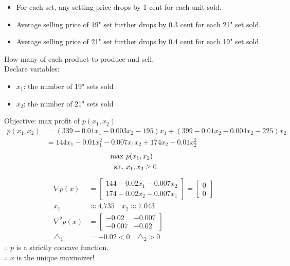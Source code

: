 \documentclass[11pt]{article}
\numberwithin{equation}{section}
\begin{document}
\begin{itemize}
    \item For each set, any setting price drops by 1 cent for each unit sold.
    \item Average selling price of 19" set further drops by 0.3 cent for each 21" set sold.
    \item Average selling price of 21" set further drops by 0.4 cent for each 19" set sold.
\end{itemize}
How many of each product to produce and sell. \\
Declare variables:\begin{itemize}
    \item $x_1$: the number of 19" sets sold
    \item $x_2$: the number of 21" sets sold
\end{itemize}
Objective: max profit of $p(x_1, x_2)$ \begin{align*}
    p(x_1, x_2) &= \left( 339 - 0.01x_1 - 0.003x_2-195 \right)x_1 + \left( 399 - 0.01x_2 - 0.004x_2 - 225 \right)x_2 \\
    &= 144 x_1 - 0.01 x_1^2 - 0.007 x_1 x_2 + 174 x_2 - 0.01 x_2^2
\end{align*}
\begin{align*}
    \max \ & p(x_1, x_2) \\
    \text{s.t.} \ & x_1,x_2 \geq 0
\end{align*}
\begin{align*}
    \nabla p(x) &= \left[\begin{array}{l}
        144-0.02 x_1 - 0.007 x_{2} \\
        174-0.02 x_{2} - 0.007 x_{1}
        \end{array}\right] = \left[\begin{array}{l}
            0 \\
            0
            \end{array}\right] \\
            x_1 &\approx 4.735 \quad x_2 \approx 7.043 \\
    \nabla^2 p(x) &= \left[\begin{array}{cc}
        -0.02 & -0.007 \\
        -0.007 & -0.02
        \end{array}\right] \\
        \triangle_1 &= -0.02 <0 \quad \triangle_2 > 0
\end{align*}
$\therefore$ $p$ is a strictly concave function. \\
$\therefore$ $\bar{x}$ is the unique maximizer!
\end{document}
